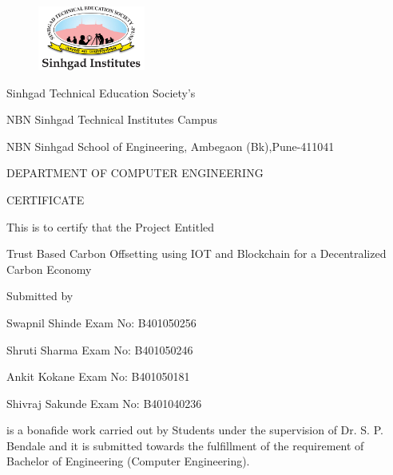 \documentclass[oneside,a4paper,12pt]{book}
\begin{document}
\newpage

\begin{figure}[ht]
\centering
\includegraphics[width=100pt]{Logo-1606151851.jpg}
\end{figure}

{
\bfseries \fontsize{11}{11} \selectfont\centerline
{Sinhgad Technical Education Society's }
\bfseries \fontsize{14}{12} \selectfont 
\centerline{NBN Sinhgad Technical Institutes Campus }
\centerline{NBN Sinhgad School of Engineering, Ambegaon (Bk),Pune-411041 }

\centerline{DEPARTMENT OF COMPUTER ENGINEERING}
\vspace*{1.5\baselineskip}} 

{\bfseries \fontsize{16}{12} \selectfont \centerline{CERTIFICATE} 
\vspace*{1\baselineskip}} 

\centerline{This is to certify that the Project Entitled}
\vspace*{.5\baselineskip} 

{\bfseries \fontsize{12}{12} \selectfont \centerline{ Trust Based Carbon Offsetting using IOT and Blockchain for a Decentralized Carbon Economy}
\vspace*{0.5\baselineskip}}

\centerline{Submitted by}
\vspace*{0.5\baselineskip} 
\centerline{Swapnil Shinde  \hspace{10 mm} Exam No: B401050256 } 
\centerline{Shruti Sharma \hspace{10 mm} Exam No: B401050246 }
\centerline{Ankit Kokane \hspace{10 mm} Exam No: B401050181  } 
\centerline{Shivraj Sakunde \hspace{10 mm} Exam No: B401040236  } 

is a bonafide work carried out by Students under the supervision of Dr. S. P. Bendale and it
is submitted towards the  fulfillment of the requirement of Bachelor of Engineering (Computer Engineering).\\
 
\end{document}
